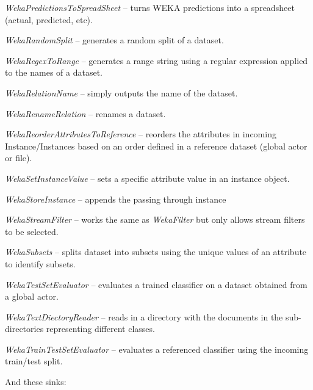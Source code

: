 \begin{tight_itemize}
	\item \textit{WekaPredictionsToSpreadSheet} -- turns WEKA predictions into
	a spreadsheet (actual, predicted, etc).
	\item \textit{WekaRandomSplit} -- generates a random split of a dataset.
	\item \textit{WekaRegexToRange} -- generates a range string using a regular
	expression applied to the names of a dataset.
	\item \textit{WekaRelationName} -- simply outputs the name of the dataset.
	\item \textit{WekaRenameRelation} -- renames a dataset.
	\item \textit{WekaReorderAttributesToReference} -- reorders the attributes
	in incoming Instance/Instances based on an order defined in a reference
	dataset (global actor or file).
	\item \textit{WekaSetInstanceValue} -- sets a specific attribute value in
	an instance object.
	\item \textit{WekaStoreInstance} -- appends the passing through instance 
	\item \textit{WekaStreamFilter} -- works the same as
	\textit{WekaFilter} but only allows stream filters to be selected.
	\item \textit{WekaSubsets} -- splits dataset into subsets using the unique
	values of an attribute to identify subsets.
	\item \textit{WekaTestSetEvaluator} -- evaluates a trained classifier on
	a dataset obtained from a global actor.
	\item \textit{WekaTextDiectoryReader} -- reads in a directory with the 
	documents in the sub-directories representing different classes.
	\item \textit{WekaTrainTestSetEvaluator} -- evaluates a referenced classifier
	using the incoming train/test split.
\end{tight_itemize}
And these sinks:
